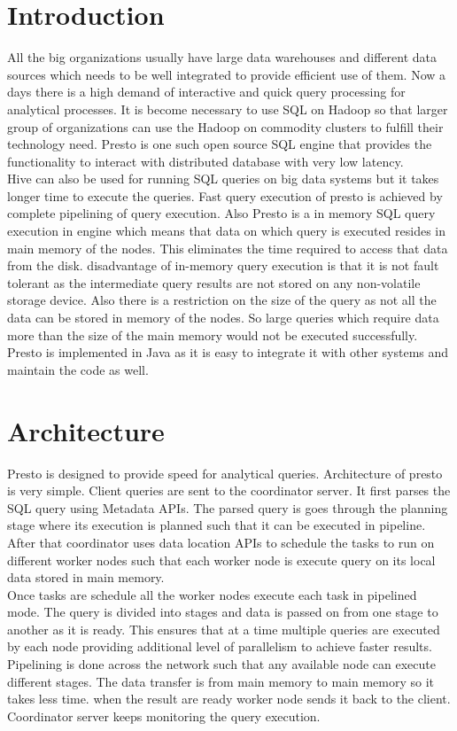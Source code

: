 \section{Introduction}
All the big organizations usually have large data warehouses and different data
sources which needs to be well integrated to provide efficient use of them. Now
a days there is a high demand of interactive and quick query processing for
analytical processes. It is become necessary to use SQL on Hadoop so that
larger group of organizations can use the Hadoop on commodity clusters to
fulfill their technology need. Presto is one such open source SQL engine that
provides the functionality to interact with distributed database with very
low latency.\\
Hive can also be used for running SQL queries on big data systems but it takes
longer time to execute the queries. Fast query execution of presto is achieved
by complete pipelining of query execution. Also Presto is a in memory SQL query
execution in engine which means that data on which query is executed resides in
main memory of the nodes. This eliminates the time required to access that data
from the disk. disadvantage of in-memory query execution is that it is not
fault tolerant as the intermediate query results are not stored on any
non-volatile storage device. Also there is a restriction on the size of the
query as not all the data can be stored in memory of the nodes. So large
queries which require data more than the size of the main memory would not be
executed successfully.\\
Presto is implemented in Java as it is easy to integrate it with other systems
and maintain the code as well.

\section{Architecture}
Presto is designed to provide speed for analytical queries. Architecture of
presto is very simple. Client queries are sent to the coordinator server. It
first parses the SQL query using Metadata APIs. The parsed query is goes through
the planning stage where its execution is planned such that it can be executed
in pipeline. After that coordinator uses data location APIs to schedule the
tasks to run on different worker nodes such that each worker node is execute
query on its local data stored in main memory. \\
Once tasks are schedule all the worker nodes execute each task in pipelined
mode. The query is divided into stages and data is passed on from one stage to
another as it is ready. This ensures that at a time multiple queries are
executed by each node providing additional level of parallelism to achieve
faster results. Pipelining is done across the network such that any available
node can execute different stages. The data transfer is from main memory to
main memory so it takes less time. when the result are ready worker node sends
it back to the client. Coordinator server keeps monitoring the query execution.



